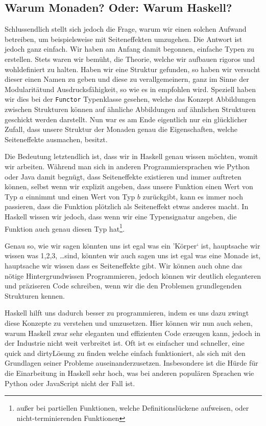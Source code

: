 \documentclass{hhuarticle}
\theoremstyle{definition}
\theoremstyle{theorem}
\begin{document}
  \subsection{Warum Monaden? Oder: Warum Haskell?}

  Schlussendlich stellt sich jedoch die Frage, warum wir einen solchen 
  Aufwand betreiben, um beispielsweise mit Seiteneffekten umzugehen.
  Die Antwort ist jedoch ganz einfach. Wir haben am Anfang damit begonnen,
  einfache Typen zu erstellen. Stets waren wir bemüht, die Theorie, welche
  wir aufbauen rigoros und wohldefiniert zu halten. Haben wir eine
  Struktur gefunden, so haben wir versucht dieser einen Namen zu geben und
  diese zu verallgemeinern, ganz im Sinne der \glqq Modularität\grqq  und
  \glqq Ausdrucksfähigkeit\grqq , so wie es in \cite{abelson1996StructureAndInterpretationOfComputerPrograms}
  empfohlen wird.
  Speziell haben wir dies bei der \verb|Functor|
  Typenklasse gesehen, welche das Konzept \glqq Abbildungen zwischen Strukturen
  können auf ähnliche Abbildungen auf ähnlichen Strukturen geschickt werden\glqq 
  darstellt. Nun war es am Ende eigentlich nur ein glücklicher
  Zufall, dass unsere Struktur der Monaden genau die Eigenschaften,
  welche Seiteneffekte ausmachen, besitzt.

  Die Bedeutung letztendlich ist, dass wir in Haskell genau wissen möchten,
  womit wir arbeiten.
  Während man sich in anderen Programmiersprachen
  wie Python oder Java damit begnügt, dass Seiteneffekte existieren
  und immer auftreten können,
  selbst wenn wir explizit angeben,
  dass unsere Funktion einen Wert von Typ $a$ einnimmt und einen Wert
  von Typ $b$ zurückgibt,
  kann es immer noch passieren, dass die Funktion plötzlich als Seiteneffekt
  etwas anderes macht.
  In Haskell wissen wir jedoch, dass wenn
  wir eine Typensignatur angeben, die Funktion auch genau diesen Typ
  hat\footnote{außer bei partiellen Funktionen, welche Definitionslückene aufweisen, oder nicht-terminierenden Funktionen}.

  Genau so, wie wir sagen könnten \glqq uns ist egal was ein 'Körper` ist,
  hauptsache wir wissen was 1,2,3, \dots sind\glqq , könnten wir auch sagen
  \glqq uns ist egal was eine Monade ist, hauptsache wir wissen dass es
  Seiteneffekte gibt\glqq . Wir können auch ohne das nötige Hintergrundwissen
  Programmieren, jedoch können wir deutlich eleganteren und präziseren Code
  schreiben, wenn wir die den Problemen grundlegenden Strukturen kennen.

  Haskell hilft uns dadurch besser zu programmieren, indem
  es uns dazu zwingt diese Konzepte zu verstehen und umzusetzen.
  Hier können wir nun auch sehen, warum Haskell zwar sehr eleganten
  und effizienten Code erzeugen kann, jedoch in der Industrie nicht
  weit verbreitet ist. Oft ist es einfacher und schneller, eine
  \glqq quick and dirty\grqq  Lösung zu finden welche \glqq einfach funktioniert\grqq ,
  als sich mit den Grundlagen seiner Probleme auseinanderzusetzen.
  Insbesondere ist die Hürde für die Einarbeitung in Haskell sehr hoch,
  was bei anderen populären Sprachen wie Python oder JavaScript nicht der Fall ist.
\end{document}
